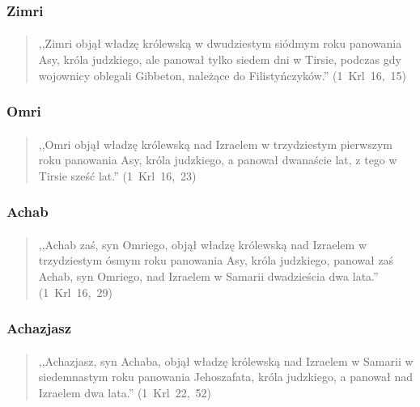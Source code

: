 \documentclass[10pt,a4paper,oneside]{article}
\begin{document}
\subsubsection{Zimri}
\paragraph{}
\begin{quote}
,,Zimri objął władzę królewską w dwudziestym siódmym roku panowania Asy, króla judzkiego, ale panował tylko siedem dni w Tirsie, podczas gdy wojownicy oblegali Gibbeton, należące do Filistyńczyków.'' \mbox{(1 Krl 16, 15)}
\end{quote}
\subsubsection{Omri}
\paragraph{}
\begin{quote}
,,Omri objął władzę królewską nad Izraelem w trzydziestym pierwszym roku panowania Asy, króla judzkiego, a panował dwanaście lat, z tego w Tirsie sześć lat.'' \mbox{(1 Krl 16, 23)}
\end{quote}
\subsubsection{Achab}
\paragraph{}
\begin{quote}
,,Achab zaś, syn Omriego, objął władzę królewską nad Izraelem w trzydziestym ósmym roku panowania Asy, króla judzkiego, panował zaś Achab, syn Omriego, nad Izraelem w Samarii dwadzieścia dwa lata.'' \mbox{(1 Krl 16, 29)}
\end{quote}
\subsubsection{Achazjasz}
\paragraph{}
\begin{quote}
,,Achazjasz, syn Achaba, objął władzę królewską nad Izraelem w Samarii w siedemnastym roku panowania Jehoszafata, króla judzkiego, a panował nad Izraelem dwa lata.'' \mbox{(1 Krl 22, 52)}
\end{quote}
\end{document}
